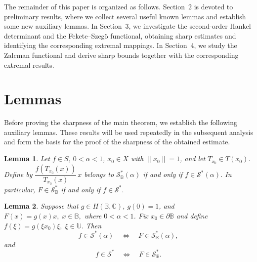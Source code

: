 \documentclass[11pt, reqno]{amsart}
\newtheorem{lem}{Lemma}[section]
\numberwithin{equation}{section}
\begin{document}
The remainder of this paper is organized as follows. Section~2 is devoted to preliminary results, where we collect several useful known lemmas and establish some new auxiliary lemmas. In Section~3, we investigate the second-order Hankel determinant and the Fekete--Szeg\"o functional, obtaining sharp estimates and identifying the corresponding extremal mappings. In Section~4, we study the Zalcman functional and derive sharp bounds together with the corresponding extremal results.
\section{{\bf Lemmas}}
Before proving the sharpness of the main theorem, we establish the following auxiliary lemmas. These results will be used repeatedly in the subsequent analysis and form the basis for the proof of the sharpness of the obtained estimate.
\begin{lem}\label{L1}\cite[Lemma 2.1]{XHX2025}
Let $f\in S$, $0<\alpha<1$, $x_0\in X$ with $\|x_0\|=1$, and let
$T_{x_0}\in T(x_0)$. Define by $\dfrac{f\!\left(T_{x_0}(x)\right)}{T_{x_0}(x)}\,x$ belongs to $\mathcal{S}_{\mathbb{B}}^{*}(\alpha)$ if and only if $f\in \mathcal{S}^{*}(\alpha)$.
In particular, $F\in \mathcal{S}_{\mathbb{B}}^{*}$ if and only if 
$f\in \mathcal{S}^{*}.$
\end{lem}
\begin{lem}\label{L2}\cite[Lemma 2.2]{XHX2025}
Suppose that $g\in H(\mathbb{B},\mathbb{C})$, $g(0)=1$, and $F(x)=g(x)x,\; x\in \mathbb{B},$
where $0<\alpha<1$. Fix $x_0\in\partial \mathbb{B}$ and define $f(\xi)=g(\xi x_0)\xi,\; \xi\in\mathbb{U}.$
Then
\[
f\in \mathcal{S}^{*}(\alpha)
\quad\Longleftrightarrow\quad
F\in \mathcal{S}_\mathbb{B}^{*}(\alpha),
\]
and
\[
f\in \mathcal{S}^{*}
\quad\Longleftrightarrow\quad
F\in \mathcal{S}_\mathbb{B}^{*}.
\]
\end{lem}
\end{document}
